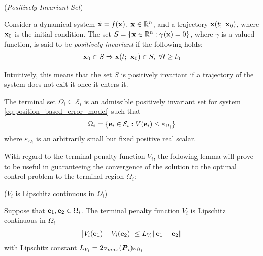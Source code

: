 \begin{bw_box}
  \begin{definition} (\textit{Positively Invariant Set})
    \label{def:positively_invariant}

    Consider a dynamical system $\dot{\bm{\mathbf{x}}} = f(\bm{\mathbf{x}})$,
    $\bm{\mathbf{x}} \in \mathbb{R}^n$, and a trajectory $\bm{\mathbf{x}}(t;\ \bm{\mathbf{x}}_0)$,
    where $\bm{\mathbf{x}}_0$ is the initial condition. The set
    $S = \{\bm{\mathbf{x}} \in \mathbb{R}^n : \gamma(\bm{\mathbf{x}}) = 0\}$, where
    $\gamma$ is a valued function, is said to be \textit{positively invariant}
    if the following holds:
    \begin{align}
      \vect{x}_0 \in S \Rightarrow \vect{x}(t;\ \vect{x}_0) \in S,\ \forall t \geq t_0
    \end{align}

    Intuitively, this means that the set $S$ is positively invariant if a
    trajectory of the system does not exit it once it enters it.
  \end{definition}
\end{bw_box}

The terminal set $\Omega_i \subseteq \mathcal{E}_i$ is an admissible
positively invariant set for system \eqref{eq:position_based_error_model}
such that
\begin{align}
  \Omega_i = \{\bm{\mathbf{e}}_i \in \mathcal{E}_i : V(\bm{\mathbf{e}}_i) \leq \varepsilon_{\Omega_i} \}
\end{align}
where $\varepsilon_{\Omega_i}$ is an arbitrarily small but fixed positive real scalar.

With regard to the terminal penalty function $V_i$, the following lemma will
prove to be useful in guaranteeing the convergence of the solution to the
optimal control problem to the terminal region $\Omega_i$:

\begin{bw_box}
\begin{lemma} ($V_i$ is Lipschitz continuous in $\Omega_i$)
\label{lemma:V_Lipschitz_e_0}

  Suppose that $\bm{\mathbf{e}}_1, \bm{\mathbf{e}}_2 \in \Omega_i$.
  The terminal penalty function $V_i$ is Lipschitz continuous in
  $\Omega_i$
  $$\big|V_i(\bm{\mathbf{e}}_1) - V_i(\bm{\mathbf{e}}_2)\big| \leq L_{V_i} \|\bm{\mathbf{e}}_1 - \bm{\mathbf{e}}_2\|$$
  with Lipschitz constant $L_{V_i} = 2 \sigma_{max}(\bm{\mathit{P}}_i) \varepsilon_{\Omega_i} $\\

\end{lemma}
\end{bw_box}


